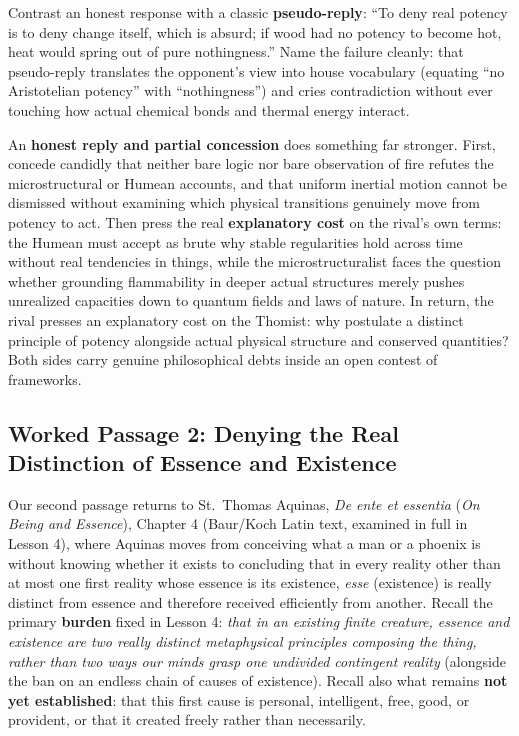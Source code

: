 Contrast an honest response with a classic \textbf{pseudo-reply}: ``To deny real potency is to deny change itself, which is absurd; if wood had no potency to become hot, heat would spring out of pure nothingness.'' Name the failure cleanly: that pseudo-reply translates the opponent's view into house vocabulary (equating ``no Aristotelian potency'' with ``nothingness'') and cries contradiction without ever touching how actual chemical bonds and thermal energy interact.

An \textbf{honest reply and partial concession} does something far stronger. First, concede candidly that neither bare logic nor bare observation of fire refutes the microstructural or Humean accounts, and that uniform inertial motion cannot be dismissed without examining which physical transitions genuinely move from potency to act. Then press the real \textbf{explanatory cost} on the rival's own terms: the Humean must accept as brute why stable regularities hold across time without real tendencies in things, while the microstructuralist faces the question whether grounding flammability in deeper actual structures merely pushes unrealized capacities down to quantum fields and laws of nature. In return, the rival presses an explanatory cost on the Thomist: why postulate a distinct principle of potency alongside actual physical structure and conserved quantities? Both sides carry genuine philosophical debts inside an open contest of frameworks.

\subsection{Worked Passage 2: Denying the Real Distinction of Essence and Existence}

Our second passage returns to St.\ Thomas Aquinas, \emph{De ente et essentia} (\emph{On Being and Essence}), Chapter 4 (Baur/Koch Latin text, examined in full in Lesson 4), where Aquinas moves from conceiving what a man or a phoenix is without knowing whether it exists to concluding that in every reality other than at most one first reality whose essence is its existence, \emph{esse} (existence) is really distinct from essence and therefore received efficiently from another. Recall the primary \textbf{burden} fixed in Lesson 4: \emph{that in an existing finite creature, essence and existence are two really distinct metaphysical principles composing the thing, rather than two ways our minds grasp one undivided contingent reality} (alongside the ban on an endless chain of causes of existence). Recall also what remains \textbf{not yet established}: that this first cause is personal, intelligent, free, good, or provident, or that it created freely rather than necessarily.

